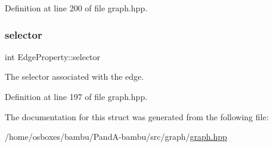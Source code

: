 Definition at line 200 of file graph.\+hpp.

\mbox{\label{structEdgeProperty_a72d059e00e64bb95ba8c4708262200e3}} 
\subsubsection{\texorpdfstring{selector}{selector}}
{\footnotesize\ttfamily int Edge\+Property\+::selector}



The selector associated with the edge. 



Definition at line 197 of file graph.\+hpp.



The documentation for this struct was generated from the following file\+:\begin{DoxyCompactItemize}
\item 
/home/osboxes/bambu/\+Pand\+A-\/bambu/src/graph/\hyperlink{graph_8hpp}{graph.\+hpp}\end{DoxyCompactItemize}
